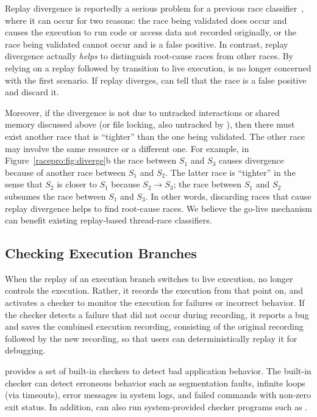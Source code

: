 Replay divergence is reportedly a serious problem for a previous race
classifier~\cite{pinsel:pldi07}, where it can occur for two
reasons: the race being validated does occur and causes the execution
to run code or access data not recorded originally, or the race being
validated cannot occur and is a false positive. In contrast, replay
divergence actually \emph{helps} \racepro to distinguish root-cause races
from other races. By relying on a replay followed by transition to
live execution, \racepro is no longer concerned with the first scenario.
If replay diverges, \racepro can tell that the race is a false positive
and discard it.

Moreover, if the divergence is not due to untracked interactions or
shared memory discussed above (or file locking, also untracked by
\racepro), then there must exist another race that is ``tighter'' than the
one being validated. The other race may involve the same resource or a
different one. For example, in Figure~\ref{racepro:fig:diverge}b the race
between $S_1$ and $S_3$ causes divergence because of another race
between $S_1$ and $S_2$. The latter race is ``tighter'' in the sense
that $S_2$ is closer to $S_1$ because $S_2 \rightarrow S_3$; the race
between $S_1$ and $S_2$ subsumes the race between $S_1$ and $S_3$. In
other words, discarding races that cause replay divergence helps \racepro
to find root-cause races. We believe the go-live mechanism can benefit
existing replay-based thread-race classifiers.

\subsection{Checking Execution Branches}  \label{racepro:sec:check}

When the replay of an execution branch switches to live
execution, \racepro no longer controls the execution. Rather, it records
the execution from that point on, and activates a checker to monitor
the execution for failures or incorrect behavior. If the checker
detects a failure that did not occur during recording,
it reports a bug and saves the combined
execution recording, consisting of the original recording followed by
the new recording, so that users can deterministically replay it for
debugging.

\racepro provides a set of built-in checkers to detect bad application
behavior. The built-in checker can detect erroneous behavior such as
segmentation faults, infinite loops (via timeouts), error messages in
system logs, and failed commands with non-zero exit status. 
In addition, \racepro can also run system-provided checker
programs such as .

